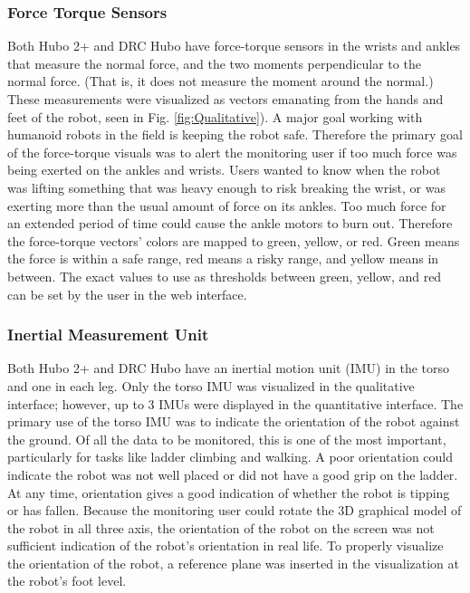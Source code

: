 \documentclass[letterpaper, 10 pt, conference]{ieee/ieeeconf}  %
\begin{document}
\subsubsection{Force Torque Sensors}
Both Hubo 2+ and DRC Hubo have force-torque sensors in the wrists and ankles that measure the normal force, and the two moments perpendicular to the normal force.
(That is, it does not measure the moment around the normal.)
These measurements were visualized as vectors emanating from the hands and feet of the robot, seen in Fig. \ref{fig:Qualitative}).
A major goal working with humanoid robots in the field is keeping the robot safe.
Therefore the primary goal of the force-torque visuals was to alert the monitoring user if too much force was being exerted on the ankles and wrists.
Users wanted to know when the robot was lifting something that was heavy enough to risk breaking the wrist, or was exerting more than the usual amount of force on its ankles.
Too much force for an extended period of time could cause the ankle motors to burn out.
Therefore the force-torque vectors' colors are mapped to green, yellow, or red. 
Green means the force is within a safe range, red means a risky range, and yellow means in between.
The exact values to use as thresholds between green, yellow, and red can be set by the user in the web interface.

\subsubsection{Inertial Measurement Unit}
Both Hubo 2+ and DRC Hubo have an inertial motion unit (IMU) in the torso and one in each leg.
Only the torso IMU was visualized in the qualitative interface; however, up to 3 IMUs were displayed in the quantitative interface.
The primary use of the torso IMU was to indicate the orientation of the robot against the ground.
Of all the data to be monitored, this is one of the most important, particularly for tasks like ladder climbing and walking.
A poor orientation could indicate the robot was not well placed or did not have a good grip on the ladder.
At any time, orientation gives a good indication of whether the robot is tipping or has fallen.
Because the monitoring user could rotate the 3D graphical model of the robot in all three axis, the orientation of the robot on the screen was not sufficient indication of the robot's orientation in real life.
To properly visualize the orientation of the robot, a reference plane was inserted in the visualization at the robot's foot level.
\end{document}
